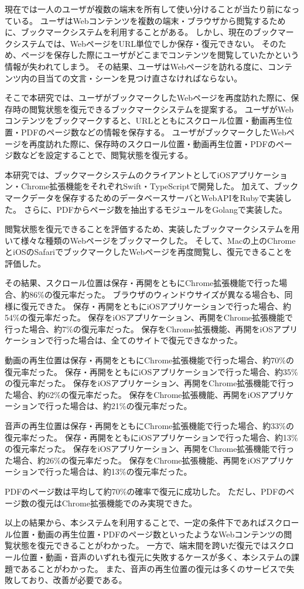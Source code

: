 \begin{jabstract}

  現在では一人のユーザが複数の端末を所有して使い分けることが当たり前になっている。
  ユーザはWebコンテンツを複数の端末・ブラウザから閲覧するために、ブックマークシステムを利用することがある。
  しかし、現在のブックマークシステムでは、WebページをURL単位でしか保存・復元できない。
  そのため、ページを保存した際にユーザがどこまでコンテンツを閲覧していたかという情報が失われてしまう。
  その結果、ユーザはWebページを訪れる度に、コンテンツ内の目当ての文言・シーンを見つけ直さなければならない。  

  そこで本研究では、ユーザがブックマークしたWebページを再度訪れた際に、保存時の閲覧状態を復元できるブックマークシステムを提案する。
  ユーザがWebコンテンツをブックマークすると、URLとともにスクロール位置・動画再生位置・PDFのページ数などの情報を保存する。
  ユーザがブックマークしたWebページを再度訪れた際に、保存時のスクロール位置・動画再生位置・PDFのページ数などを設定することで、閲覧状態を復元する。

  本研究では、ブックマークシステムのクライアントとしてiOSアプリケーション・Chrome拡張機能をそれぞれSwift・TypeScriptで開発した。
  加えて、ブックマークデータを保存するためのデータベースサーバとWebAPIをRubyで実装した。
  さらに、PDFからページ数を抽出するモジュールをGolangで実装した。

  閲覧状態を復元できることを評価するため、実装したブックマークシステムを用いて様々な種類のWebページをブックマークした。
  そして、Macの上のChromeとiOSのSafariでブックマークしたWebページを再度閲覧し、復元できることを評価した。

 その結果、スクロール位置は保存・再開をともにChrome拡張機能で行った場合、約86\%の復元率だった。
ブラウザのウィンドウサイズが異なる場合も、同様に復元できた。
保存・再開をともにiOSアプリケーションで行った場合、約54\%の復元率だった。
保存をiOSアプリケーション、再開をChrome拡張機能で行った場合、約7\%の復元率だった。
保存をChrome拡張機能、再開をiOSアプリケーションで行った場合は、全てのサイトで復元できなかった。

動画の再生位置は保存・再開をともにChrome拡張機能で行った場合、約70\%の復元率だった。
保存・再開をともにiOSアプリケーションで行った場合、約35\%の復元率だった。
保存をiOSアプリケーション、再開をChrome拡張機能で行った場合、約62\%の復元率だった。
保存をChrome拡張機能、再開をiOSアプリケーションで行った場合は、約21\%の復元率だった。

音声の再生位置は保存・再開をともにChrome拡張機能で行った場合、約33\%の復元率だった。
保存・再開をともにiOSアプリケーションで行った場合、約13\%の復元率だった。
保存をiOSアプリケーション、再開をChrome拡張機能で行った場合、約26\%の復元率だった。
保存をChrome拡張機能、再開をiOSアプリケーションで行った場合は、約13\%の復元率だった。

PDFのページ数は平均して約70\%の確率で復元に成功した。
ただし、PDFのページ数の復元はChrome拡張機能でのみ実現できた。

  以上の結果から、本システムを利用することで、一定の条件下であればスクロール位置・動画の再生位置・PDFのページ数といったようなWebコンテンツの閲覧状態を復元できることがわかった。
  一方で、端末間を跨いだ復元ではスクロール位置・動画・音声のいずれも復元に失敗するケースが多く、本システムの課題であることがわかった。
  また、音声の再生位置の復元は多くのサービスで失敗しており、改善が必要である。

\end{jabstract}
